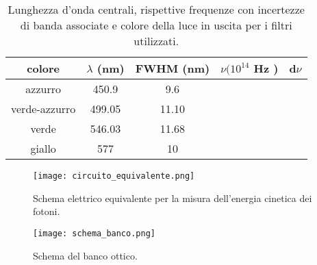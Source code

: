 \documentclass[10pt,a4paper]{article}
\begin{document}
\begin{table}[h]
\caption{\small Lunghezza d'onda centrali, rispettive frequenze con incertezze di banda associate e colore della luce in uscita per i filtri utilizzati. }
\label{tab:filtri}
\begin{center}
\begin{tabular}{|c|c|c|c|c|}
\hline
colore & $\lambda$ (nm) & FWHM (nm) & $\nu (10^{14} $ Hz ) & d$\nu$   \\
\hline 
azzurro & 450.9 & 9.6 & & \\
\hline
verde-azzurro & 499.05 & 11.10 & &\\
\hline
verde & 546.03  & 11.68 & &\\
\hline
giallo & 577  &  10 & & \\
\hline
\end{tabular}
\end{center}
\end{table}

\begin{figure}[h]
\begin{center}
\texttt{[image: circuito\_equivalente.png]}
\caption{\small Schema elettrico equivalente per la misura dell'energia cinetica dei fotoni. }
\label{fig:cireq}
\end{center}
\end{figure}

\begin{figure}[h]
\begin{center}
\texttt{[image: schema\_banco.png]}
\caption{\small Schema del banco ottico. }
\label{fig:schemabanco}
\end{center}
\end{figure}

\newpage
\end{document}
